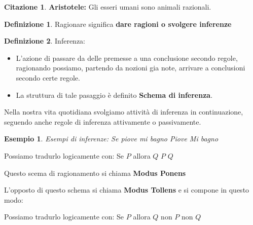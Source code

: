 \documentclass[../main.tex, class=letterpaper]{subfiles}
\newtheorem{exmp}{Esempio}[section]
\theoremstyle{definition}
\newtheorem{cit}{Citazione}[section]
\newtheorem{definition}{Definizione}[section]
\begin{document}
\begin{tcolorbox}
\begin{cit}
        \textbf{Aristotele:} Gli esseri umani sono animali razionali. 
\end{cit}
\end{tcolorbox}

\begin{definition}
       Ragionare significa \textbf{dare ragioni o svolgere inferenze}  
\end{definition}
\begin{definition}
        Inferenza: \newline
        \begin{itemize}
                \item L'azione di passare da delle premesse a una conclusione secondo regole, ragionando possiamo, partendo da nozioni gia note, arrivare a conclusioni secondo certe regole.
                \item La struttura di tale pasaggio è definito \textbf{Schema di inferenza}. 
        \end{itemize}
\end{definition}
Nella nostra vita quotidiana svolgiamo attività di inferenza in continuazione, seguendo anche regole di inferenza attivamente o passivamente.

\begin{exmp}
        Esempi di inferenze: \newline
        Se piove mi bagno \newline
        Piove \newline
        Mi bagno 
\end{exmp}

\begin{tcolorbox}
        Possiamo tradurlo logicamente con: \newline
        Se $ P $ allora $ Q $ \newline
        $ P $ \newline
        $ Q $ \newline 
\end{tcolorbox}
Questo scema di ragionamento si chiama \textbf{Modus Ponens} \par

L'opposto di questo schema si chiama \textbf{Modus Tollens} e si compone in questo modo:
\begin{tcolorbox}
        Possiamo tradurlo logicamente con: \newline
        Se $ P $ allora $ Q $ \newline
        non $ P $ \newline
        non $ Q $ \newline 
\end{tcolorbox}
\end{document}
